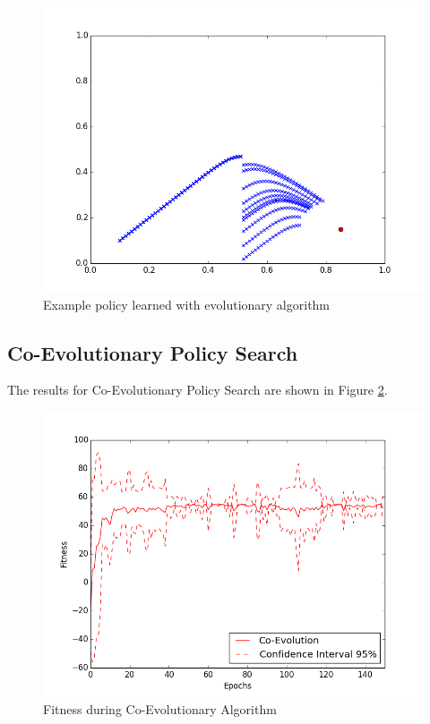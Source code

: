 \begin{figure}[ht]
  \centering
  \includegraphics[scale=0.5]{images/evo_result.png}
  \caption{Example policy learned with evolutionary algorithm}\label{Example policy learned with evolutionary algorithm}
\end{figure}

\subsection{Co-Evolutionary Policy Search}

The results for Co-Evolutionary Policy Search are shown in Figure \ref{Fitness during Co-Evolutionary Algorithm}. 

\begin{figure}[ht]
  \centering
  \includegraphics[scale=0.5]{images/co_evo.png}
  \caption{Fitness during Co-Evolutionary Algorithm}\label{Fitness during Co-Evolutionary Algorithm}
\end{figure}

